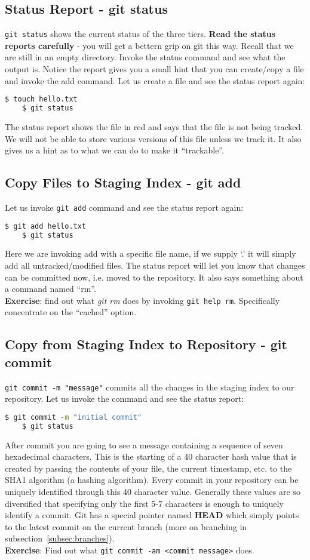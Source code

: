 \documentclass{article}
\begin{document}
\subsection{Status Report - git status}
\verb|git status| shows the current status of the three tiers.
\textbf{Read the status reports carefully} - you will get a bettern grip on git this way.
Recall that we are still in an empty directory.
Invoke the status command and see what the output is.
Notice the report gives you a small hint that you can create/copy a file and invoke the add command.
Let us create a file and see the status report again:
\begin{lstlisting}[language=bash]
	$ touch hello.txt
	$ git status
\end{lstlisting}
The status report shows the file in red and says that the file is not being tracked.
We will not be able to store various versions of this file unless we track it.
It also gives us a hint as to what we can do to make it ``trackable''.

\subsection{Copy Files to Staging Index - git add}
Let us invoke \verb|git add| command and see the status report again:
\begin{lstlisting}[language=bash]
	$ git add hello.txt
	$ git status
\end{lstlisting}
Here we are invoking add with a specific file name, if we supply `.' it will simply add all untracked/modified files.
The status report will let you know that changes can be committed now, i.e. moved to the repository.
It also says something about a command named ``rm''.\\ \textbf{Exercise}: find out what \textit{git rm} does by
invoking \verb|git help rm|. Specifically concentrate on the ``cached'' option.

\subsection{Copy from Staging Index to Repository - git commit}
\verb|git commit -m "message"| commits all the changes in the staging index to our repository.
Let us invoke the command and see the status report:
\begin{lstlisting}[language=bash]
	$ git commit -m "initial commit"
	$ git status
\end{lstlisting}
After commit you are going to see a message containing a sequence of seven hexadecimal characters.
This is the starting of a 40 character hash value that is created by passing the contents of your file, the current timestamp, etc.
to the SHA1 algorithm (a hashing algorithm).
Every commit in your repository can be uniquely identified through this 40 character value.
Generally these values are so diversified that specifying only the first 5-7 characters is enough to uniquely identify a commit.
Git has a special pointer named \textbf{HEAD} which simply points to the latest commit on the current branch 
(more on branching in subsection~\ref{subsec:branches}).
\\\textbf{Exercise}: Find out what \verb|git commit -am <commit message>| does.
\end{document}
